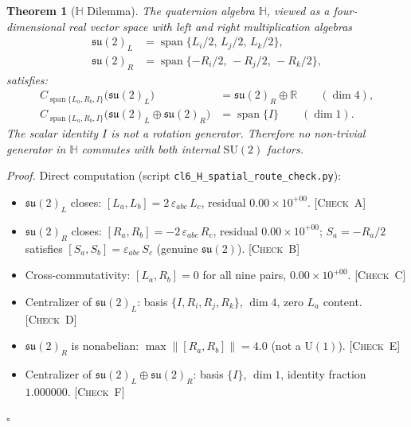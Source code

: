 \documentclass[aip,jmp,amsmath,amssymb,reprint,author-year]{revtex4-2}
\newtheorem{theorem}{Theorem}
\newenvironment{proof}[1][Proof]{\par\noindent\textit{#1.}\space\ignorespaces}{\hfill$\square$\par\medskip}
\begin{document}
\begin{theorem}[$\mathbb{H}$ Dilemma]
\label{thm:Hdilemma}
The quaternion algebra $\mathbb{H}$, viewed as a four-dimensional real
vector space with left and right multiplication algebras
\begin{align}
\mathfrak{su}(2)_L &= \operatorname{span}\{L_i/2,\, L_j/2,\, L_k/2\},
\\
\mathfrak{su}(2)_R &= \operatorname{span}\{-R_i/2,\, -R_j/2,\,
  -R_k/2\},
\end{align}
satisfies:
\begin{align}
C_{\operatorname{span}\{L_a, R_b, I\}}
  \!\bigl(\mathfrak{su}(2)_L\bigr)
  &= \mathfrak{su}(2)_R \oplus \mathbb{R}
  \qquad (\dim 4),
\label{eq:cent-suL}
\\
C_{\operatorname{span}\{L_a, R_b, I\}}
  \!\bigl(\mathfrak{su}(2)_L \oplus \mathfrak{su}(2)_R\bigr)
  &= \operatorname{span}\{I\}
  \qquad (\dim 1).
\label{eq:cent-full}
\end{align}
The scalar identity $I$ is not a rotation generator.  Therefore no
non-trivial generator in $\mathbb{H}$ commutes with both internal\/
$\mathrm{SU}(2)$ factors.
\end{theorem}

\begin{proof}
Direct computation (script
\texttt{cl6\_H\_spatial\_route\_check.py}):

\begin{itemize}
\item $\mathfrak{su}(2)_L$ closes:
  $[L_a, L_b] = 2\,\varepsilon_{abc}\,L_c$,
  residual $0.00 \times 10^{+00}$.
  \textsc{[Check~A]}

\item $\mathfrak{su}(2)_R$ closes:
  $[R_a, R_b] = -2\,\varepsilon_{abc}\,R_c$,
  residual $0.00 \times 10^{+00}$;
  $S_a = -R_a/2$ satisfies
  $[S_a, S_b] = \varepsilon_{abc}\,S_c$ (genuine $\mathfrak{su}(2)$).
  \textsc{[Check~B]}

\item Cross-commutativity:
  $[L_a, R_b] = 0$ for all nine pairs, $0.00 \times 10^{+00}$.
  \textsc{[Check~C]}

\item Centralizer of $\mathfrak{su}(2)_L$: basis
  $\{I, R_i, R_j, R_k\}$, $\dim 4$, zero $L_a$ content.
  \textsc{[Check~D]}

\item $\mathfrak{su}(2)_R$ is nonabelian:
  $\max\|[R_a, R_b]\| = 4.0$ (not a $\mathrm{U}(1)$).
  \textsc{[Check~E]}

\item Centralizer of $\mathfrak{su}(2)_L \oplus \mathfrak{su}(2)_R$:
  basis $\{I\}$, $\dim 1$, identity fraction $1.000000$.
  \textsc{[Check~F]}
\end{itemize}
\end{proof}
\end{document}
